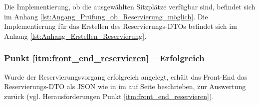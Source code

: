 Die Implementierung, ob die ausgewählten Sitzplätze verfügbar sind, befindet sich im Anhang \vref{lst:Angang_Prüfung_ob_Reservierung_möglich}. Die Implementierung für das Erstellen des Reservierungs-\acp{DTO} befindet sich im Anhang \vref{lst:Anhang_Erstellen_Reservierung}.  

\subsubsection*{Punkt \ref{itm:front_end_reservieren} -- Erfolgreich}
\label{ssssec:front_end_reservieren}
Wurde der Reservierungsvorgang erfolgreich angelegt, erhält das Front-End das Reservierungs-\acs{DTO} als \acs{JSON} wie in  im  auf Seite \pageref{ssssec:erfolgreich_blocken} beschrieben, zur Auswertung zurück (vgl. Herausforderungen Punkt \vref{itm:front_end_reservieren}). 
